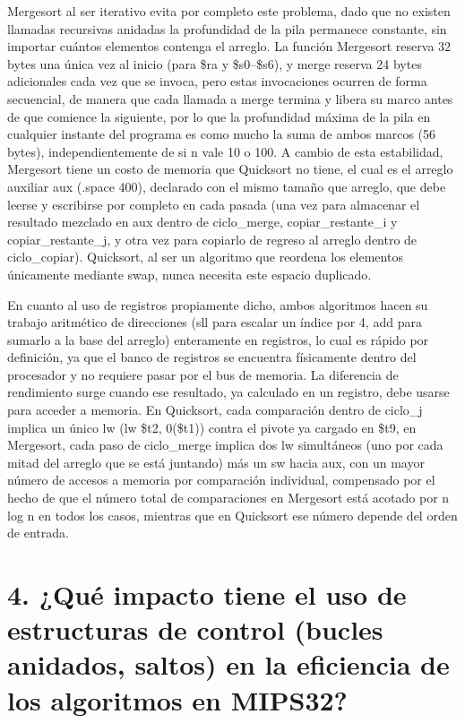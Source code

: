 \documentclass[12pt, letterpaper]{article}
\begin{document}
Mergesort al ser iterativo evita por completo este problema, dado que no existen llamadas recursivas anidadas la profundidad de la pila permanece constante, sin importar cuántos elementos contenga el arreglo. La función Mergesort reserva 32 bytes una única vez al inicio (para \$ra y \$s0–\$s6), y merge reserva 24 bytes adicionales cada vez que se invoca, pero estas invocaciones ocurren de forma secuencial, de manera que cada llamada a merge termina y libera su marco antes de que comience la siguiente, por lo que la profundidad máxima de la pila en cualquier instante del programa es como mucho la suma de ambos marcos (56 bytes), independientemente de si n vale 10 o 100. A cambio de esta estabilidad, Mergesort tiene un costo de memoria que Quicksort no tiene, el cual es el arreglo auxiliar aux (.space 400), declarado con el mismo tamaño que arreglo, que debe leerse y escribirse por completo en cada pasada (una vez para almacenar el resultado mezclado en aux dentro de ciclo\_merge, copiar\_restante\_i y copiar\_restante\_j, y otra vez para copiarlo de regreso al arreglo dentro de ciclo\_copiar). Quicksort, al ser un algoritmo que reordena los elementos únicamente mediante swap, nunca necesita este espacio duplicado.

En cuanto al uso de registros propiamente dicho, ambos algoritmos hacen su trabajo aritmético de direcciones (sll para escalar un índice por 4, add para sumarlo a la base del arreglo) enteramente en registros, lo cual es rápido por definición, ya que el banco de registros se encuentra físicamente dentro del procesador y no requiere pasar por el bus de memoria. La diferencia de rendimiento surge cuando ese resultado, ya calculado en un registro, debe usarse para acceder a memoria. En Quicksort, cada comparación dentro de ciclo\_j implica un único lw (lw \$t2, 0(\$t1)) contra el pivote ya cargado en \$t9, en Mergesort, cada paso de ciclo\_merge implica dos lw simultáneos (uno por cada mitad del arreglo que se está juntando) más un sw hacia aux, con un mayor número de accesos a memoria por comparación individual, compensado por el hecho de que el número total de comparaciones en Mergesort está acotado por n log n en todos los casos, mientras que en Quicksort ese número depende del orden de entrada.\newpage

\section*{4. ¿Qué impacto tiene el uso de estructuras de control (bucles anidados, saltos) en la eficiencia de los algoritmos en MIPS32?}
\end{document}
